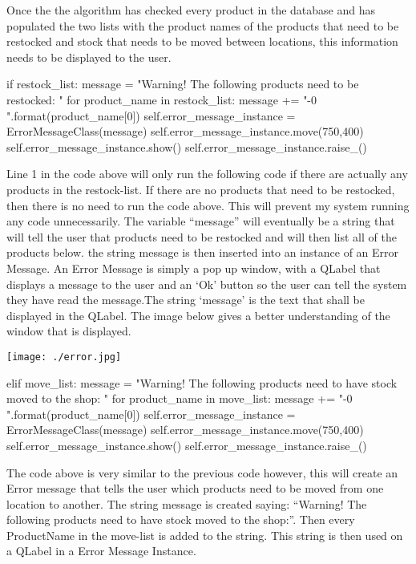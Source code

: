 Once the the algorithm has checked every product in the database and has populated the two lists with the product names of the products that need to be restocked and stock that needs to be moved between locations, this information needs to be displayed to the user.

\begin{python}
if restock_list:
            message = "Warning! \n \n The following products need to be restocked: \n \n "
            for product_name in restock_list:
                message += "-{0} \n".format(product_name[0])
            self.error_message_instance = ErrorMessageClass(message)
            self.error_message_instance.move(750,400)
            self.error_message_instance.show()
            self.error_message_instance.raise_()
\end{python}

Line 1 in the code above will only run the following code if there are actually any products in the restock-list. If there are no products that need to be restocked, then there is no need to run the code above. This will prevent my system running any code unnecessarily. The variable ``message'' will eventually be a string that will tell the user that products need to be restocked and will then list all of the products below. the string message is then inserted into an instance of an Error Message. An Error Message is simply a pop up window, with a QLabel that displays a message to the user and an `Ok' button so the user can tell the system they have read the message.The string `message' is the text that shall be displayed in the QLabel. The image below gives a better understanding of the window that is displayed.

\texttt{[image: ./error.jpg]}
\label{fig:move-stock-message}

\begin{python}
elif move_list:
            message = "Warning! \n \n The following products need to have stock moved to the shop: \n \n"
            for product_name in move_list:
                message += "-{0} \n".format(product_name[0])
            self.error_message_instance = ErrorMessageClass(message)
            self.error_message_instance.move(750,400)
            self.error_message_instance.show()
            self.error_message_instance.raise_()
\end{python}

The code above is very similar to the previous code however, this will create an Error message that tells the user which products need to be moved from one location to another. The string message is created saying: ``Warning! The following products need to have stock moved to the shop:''. Then every ProductName in the move-list is added to the string. This string is then used on a QLabel in a Error Message Instance.

